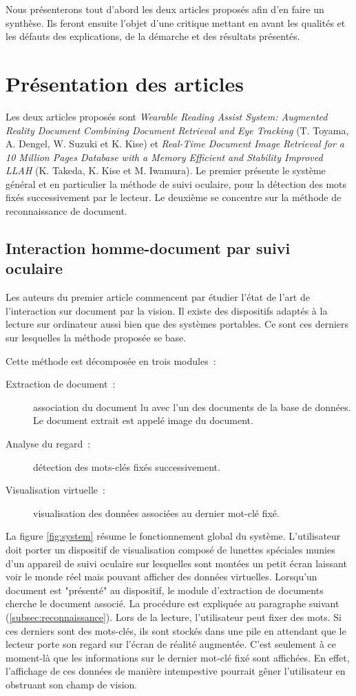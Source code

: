 \documentclass[a4paper]{article}
\begin{document}
Nous présenterons tout d'abord les deux articles proposés afin d'en faire un synthèse. Ils feront ensuite l'objet d'une critique mettant en avant les qualités et les défauts des explications, de la démarche et des résultats présentés.

\section{Présentation des articles}

Les deux articles proposés sont \textit{Wearable Reading Assist System: Augmented Reality Document Combining Document Retrieval and Eye Tracking} (T. Toyama, A. Dengel, W. Suzuki et K. Kise) et \textit{Real-Time Document Image Retrieval for a 10 Million Pages Database with a Memory Efficient and Stability Improved LLAH} (K. Takeda, K. Kise et M. Iwamura). Le premier présente le système général et en particulier la méthode de suivi oculaire, pour la détection des mots fixés successivement par le lecteur. Le deuxième se concentre sur la méthode de reconnaissance de document.

\subsection{Interaction homme-document par suivi oculaire}

Les auteurs du premier article commencent par étudier l'état de l'art de l'interaction sur document par la vision. Il existe des dispositifs adaptés à la lecture sur ordinateur aussi bien que des systèmes portables. Ce sont ces derniers sur lesquelles la méthode proposée se base.

Cette méthode est décomposée en trois modules~:
\begin{description}
	\item[Extraction de document~:] association du document lu avec l'un des documents de la base de données. Le document extrait est appelé image du document.
	\item[Analyse du regard~:] détection des mots-clés fixés successivement.
	\item[Visualisation virtuelle~:] visualisation des données associées au dernier mot-clé fixé.
\end{description}

La figure \ref{fig:system} résume le fonctionnement global du système. L'utilisateur doit porter un dispositif de visualisation composé de lunettes spéciales munies d'un appareil de suivi oculaire sur lesquelles sont montées un petit écran laissant voir le monde réel mais pouvant afficher des données virtuelles. Lorsqu'un document est "présenté" au dispositif, le module d'extraction de documents cherche le document associé. La procédure est expliquée au paragraphe suivant (\ref{subsec:reconnaissance}). Lors de la lecture, l'utilisateur peut fixer des mots. Si ces derniers sont des mots-clés, ils sont stockés dans une pile en attendant que le lecteur porte son regard sur l'écran de réalité augmentée. C'est seulement à ce moment-là que les informations sur le dernier mot-clé fixé sont affichées. En effet, l'affichage de ces données de manière intempestive pourrait gêner l'utilisateur en obstruant son champ de vision.
\end{document}
